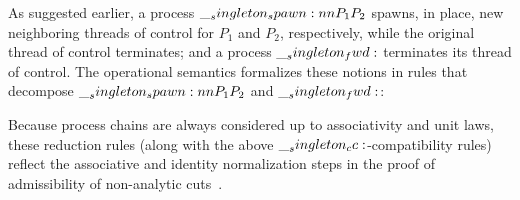 As suggested earlier, a process $\__singleton_spawn:nn {P_1} {P_2}$ spawns, in place, new neighboring threads of control for $P_1$ and $P_2$, respectively, while the original thread of control terminates; and a process $\__singleton_fwd:$ terminates its thread of control.
The operational semantics formalizes these notions in rules that decompose $\__singleton_spawn:nn {P_1} {P_2}$ and $\__singleton_fwd:$:
%
Because process chains are always considered up to associativity and unit laws, these reduction rules (along with the above $\__singleton_cc:$-compatibility rules) reflect the associative and identity normalization steps in the proof of admissibility of non-analytic cuts~.

